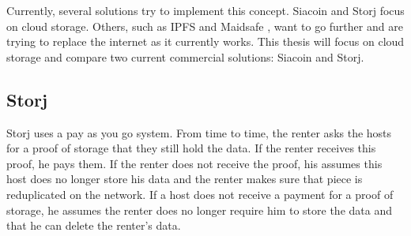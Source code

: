 Currently, several solutions try to implement this concept. Siacoin \cite{siacoin} and Storj \cite{storj} focus on cloud storage. Others, such as IPFS \cite{IPFS} and Maidsafe \cite{maidsafe}, want to go further and are trying to replace the internet as it currently works. This thesis will focus on cloud storage and compare two current commercial solutions: Siacoin and Storj.


\subsection{Storj}

\iffalse
# storj

- storj: uses a pay as you go system. every now and then you ask your storage providers for a proof that they are still holding your data. if you receive this proof, you pay them. If you do not receive a proof, you can assume this data is lost and make sure that piece of your date is reduplicated on the network. if a storage provider does not get paid for his proof, he can assume the user does not longer require him to store the data allowing him to delete this shard. 

- There are still some issues though: 
  - hosts take a risk when storing data, as they are never sure they will be paid. in the most extreme case, a malicious host might store a lot of data on the network, but never pay the first proof of storage, wasting this storage space. This effectively executes a denial of service attack on the network.
  - hosts do have no cost of not providing a proof of storage. 
  this makes the network very vulnerable to a sybil attack \ref{sybil-attack}. in which one malicious agent pretends to be several hosts at same time, at no cost. renters might think their data is secure, as it is duplicated over several hosts. However, the one malicious agent can turn off all his hosts, effectively destroying the stored data.


\fi


Storj uses a pay as you go system. From time to time, the renter asks the hosts for a proof of storage that they still hold the data. If the renter receives this proof, he pays them. If the renter does not receive the proof, his assumes this host does no longer store his data and the renter makes sure that piece is reduplicated on the network. If a host does not receive a payment for a proof of storage, he assumes the renter does no longer require him to store the data and that he can delete the renter's data. \cite{storj}

